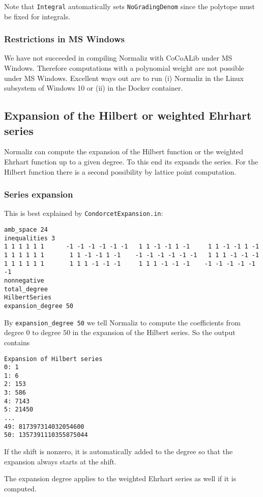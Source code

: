 \documentclass[12pt,a4paper]{scrartcl}
\theoremstyle{definition}
\begin{document}
{Note that \verb|Integral| automatically sets \verb|NoGradingDenom| since the polytope must be fixed for integrals. 

\subsubsection{Restrictions in MS Windows}

We have not succeeded in compiling Normaliz with CoCoALib under MS Windows. Therefore computations with a polynomial weight are not possible under MS Windows.
Excellent ways out are  to run (i) Normaliz in the Linux subsystem of Windows 10 or (ii) in the Docker container.

\subsection{Expansion of the Hilbert or weighted Ehrhart series}\label{expansion}

Normaliz can compute the expansion of the Hilbert function or the weighted Ehrhart function up to a given degree. To this end its expands the series. For the Hilbert function there is a second possibility by lattice point computation.

\subsubsection{Series expansion}
This is best explained by \verb|CondorcetExpansion.in|:
\begin{Verbatim}
amb_space 24
inequalities 3
1 1 1 1 1 1      -1 -1 -1 -1 -1 -1   1 1 -1 -1 1 -1     1 1 -1 -1 1 -1
1 1 1 1 1 1       1 1 -1 -1 1 -1    -1 -1 -1 -1 -1 -1   1 1 1 -1 -1 -1
1 1 1 1 1 1       1 1 1 -1 -1 -1     1 1 1 -1 -1 -1    -1 -1 -1 -1 -1 -1
nonnegative
total_degree
HilbertSeries
expansion_degree 50
\end{Verbatim}
By \verb|expansion_degree 50| we tell Normaliz to compute the coefficients from degree $0$ to degree $50$  in the expansion of the Hilbert series. So the output contains
\begin{Verbatim}
Expansion of Hilbert series
0: 1
1: 6
2: 153
3: 586
4: 7143
5: 21450
...
49: 817397314032054600
50: 1357391110355875044
\end{Verbatim}
If the shift is nonzero, it is automatically added to the degree so that the expansion always starts at the shift. 

The expansion degree applies to the weighted Ehrhart series as well if it is computed.

}
\end{document}
